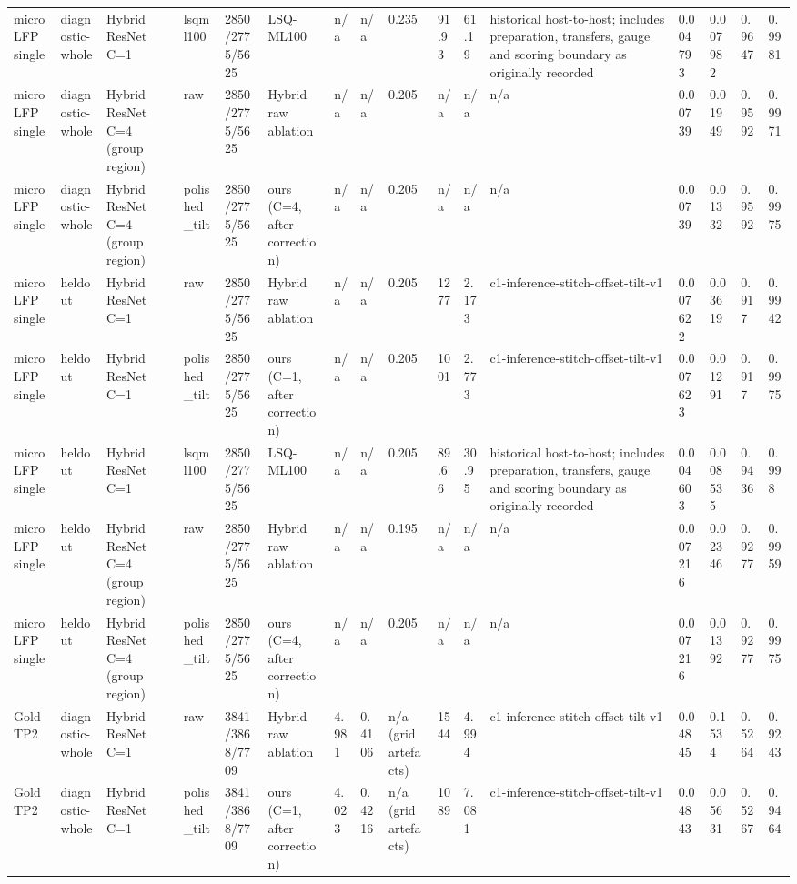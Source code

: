 \begin{tabular}{llllllllllllllll}
microLFP single & diagnostic-whole & Hybrid ResNet C=1 & lsqml100 & 2850/2775/5625 & LSQ-ML100 & n/a & n/a & 0.235 & 91.93 & 61.19 & historical host-to-host; includes preparation, transfers, gauge and scoring boundary as originally recorded & 0.004793 & 0.007982 & 0.9647 & 0.9981 \\
microLFP single & diagnostic-whole & Hybrid ResNet C=4 (group region) & raw & 2850/2775/5625 & Hybrid raw ablation & n/a & n/a & 0.205 & n/a & n/a & n/a & 0.00739 & 0.01949 & 0.9592 & 0.9971 \\
microLFP single & diagnostic-whole & Hybrid ResNet C=4 (group region) & polished\_tilt & 2850/2775/5625 & ours (C=4, after correction) & n/a & n/a & 0.205 & n/a & n/a & n/a & 0.00739 & 0.01332 & 0.9592 & 0.9975 \\
microLFP single & heldout & Hybrid ResNet C=1 & raw & 2850/2775/5625 & Hybrid raw ablation & n/a & n/a & 0.205 & 1277 & 2.173 & c1-inference-stitch-offset-tilt-v1 & 0.007622 & 0.03619 & 0.917 & 0.9942 \\
microLFP single & heldout & Hybrid ResNet C=1 & polished\_tilt & 2850/2775/5625 & ours (C=1, after correction) & n/a & n/a & 0.205 & 1001 & 2.773 & c1-inference-stitch-offset-tilt-v1 & 0.007623 & 0.01291 & 0.917 & 0.9975 \\
microLFP single & heldout & Hybrid ResNet C=1 & lsqml100 & 2850/2775/5625 & LSQ-ML100 & n/a & n/a & 0.205 & 89.66 & 30.95 & historical host-to-host; includes preparation, transfers, gauge and scoring boundary as originally recorded & 0.004603 & 0.008535 & 0.9436 & 0.998 \\
microLFP single & heldout & Hybrid ResNet C=4 (group region) & raw & 2850/2775/5625 & Hybrid raw ablation & n/a & n/a & 0.195 & n/a & n/a & n/a & 0.007216 & 0.02346 & 0.9277 & 0.9959 \\
microLFP single & heldout & Hybrid ResNet C=4 (group region) & polished\_tilt & 2850/2775/5625 & ours (C=4, after correction) & n/a & n/a & 0.205 & n/a & n/a & n/a & 0.007216 & 0.01392 & 0.9277 & 0.9975 \\
Gold TP2 & diagnostic-whole & Hybrid ResNet C=1 & raw & 3841/3868/7709 & Hybrid raw ablation & 4.981 & 0.4106 & n/a (grid artefacts) & 1544 & 4.994 & c1-inference-stitch-offset-tilt-v1 & 0.04845 & 0.1534 & 0.5264 & 0.9243 \\
Gold TP2 & diagnostic-whole & Hybrid ResNet C=1 & polished\_tilt & 3841/3868/7709 & ours (C=1, after correction) & 4.023 & 0.4216 & n/a (grid artefacts) & 1089 & 7.081 & c1-inference-stitch-offset-tilt-v1 & 0.04843 & 0.05631 & 0.5267 & 0.9464 \\

\end{tabular}
